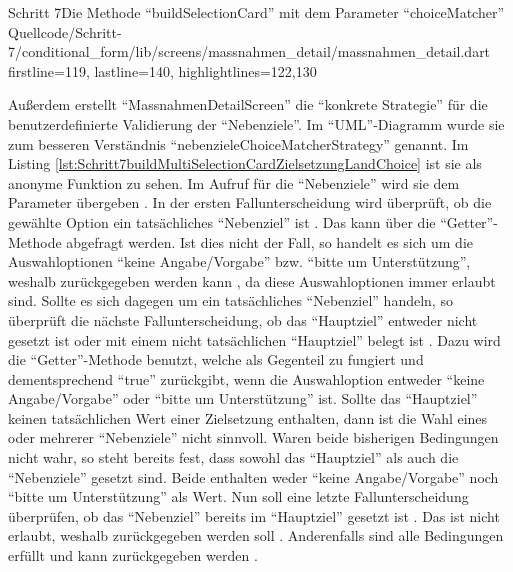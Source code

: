 \begin{alexlisting}{Schritt 7}{Die Methode \enquote{buildSelectionCard} mit dem Parameter \enquote{choiceMatcher}}
  {Quellcode/Schritt-7/conditional_form/lib/screens/massnahmen_detail/massnahmen_detail.dart}
  {firstline=119, lastline=140, highlightlines={122,130}}
  \label{lst:Schritt7buildSelectionCard}
\end{alexlisting}

\clearpage

Außerdem erstellt \enquote{MassnahmenDetailScreen} die \enquote{konkrete Strategie} für die benutzerdefinierte Validierung der \enquote{Nebenziele}. Im \enquote{UML}-Diagramm wurde sie zum besseren Verständnis \enquote{nebenzieleChoiceMatcherStrategy} genannt. Im Listing \ref{lst:Schritt7buildMultiSelectionCardZielsetzungLandChoice} ist sie als anonyme Funktion zu sehen.
Im Aufruf  für die \enquote{Nebenziele} wird sie dem Parameter  übergeben .
In der ersten Fallunterscheidung wird überprüft,
ob die gewählte Option ein tatsächliches \enquote{Nebenziel} ist .
Das kann über die \enquote{Getter}-Methode  abgefragt werden.
Ist dies nicht der Fall,
so handelt es sich um die Auswahloptionen \enquote{keine Angabe/Vorgabe} bzw. \enquote{bitte um Unterstützung},
weshalb  zurückgegeben werden kann ,
da diese Auswahloptionen immer erlaubt sind.
Sollte es sich dagegen um ein tatsächliches \enquote{Nebenziel} handeln,
so überprüft die nächste Fallunterscheidung,
ob das \enquote{Hauptziel} entweder nicht gesetzt ist
oder mit einem nicht tatsächlichen \enquote{Hauptziel} belegt ist .
Dazu wird die \enquote{Getter}-Methode  benutzt,
welche als Gegenteil zu  fungiert
und dementsprechend \enquote{true} zurückgibt, wenn die Auswahloption entweder \enquote{keine Angabe/Vorgabe} oder \enquote{bitte um Unterstützung} ist.
Sollte das \enquote{Hauptziel} keinen tatsächlichen Wert einer Zielsetzung enthalten,
dann ist die Wahl eines oder mehrerer \enquote{Nebenziele} nicht sinnvoll.
Waren beide bisherigen Bedingungen nicht wahr,
so steht bereits fest,
dass sowohl das \enquote{Hauptziel}
als auch die \enquote{Nebenziele} gesetzt sind.
Beide enthalten weder \enquote{keine Angabe/Vorgabe}
noch \enquote{bitte um Unterstützung} als Wert.
Nun soll eine letzte Fallunterscheidung überprüfen,
ob das \enquote{Nebenziel} bereits im \enquote{Hauptziel} gesetzt ist .
Das ist nicht erlaubt,
weshalb  zurückgegeben werden soll .
Anderenfalls sind alle Bedingungen erfüllt und  kann zurückgegeben werden .

